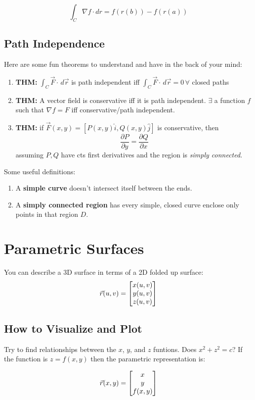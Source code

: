\documentclass[a4paper,12pt]{report}
\begin{document}
$$\int_C \nabla f \cdot dr = f(r(b)) - f(r(a))$$

\subsection{Path Independence}
Here are some fun theorems to understand and have in the back of your mind: 
\begin{enumerate}
\item \textbf{THM: } $\int_C \vec{F}\cdot\,d\vec{r}$ is path independent iff 
$\int_C \vec{F}\cdot\,d\vec{r} = 0 \, \forall$ closed paths
\item \textbf{THM: } A vector field is conservative iff it is path independent. 
$\exists$ a function $f$ such that $\nabla f = F$ iff conservative/path independent.
\item \textbf{THM: } if $\vec{F}(x, y) = [P(x, y)\hat{i}, Q(x, y)\hat{j}]$ is conservative, 
then $$\frac{\partial P}{\partial y} = \frac{\partial Q}{\partial x}$$ assuming $P, Q$ have cts first derivatives and 
the region is \textit{simply connected}.
\end{enumerate}

Some useful definitions:
\begin{enumerate}
\item A \textbf{simple curve} doesn't intersect itself between the ends.
\item A \textbf{simply connected region} has every simple, closed curve enclose only points in that region $D$.
\end{enumerate}

\section{Parametric Surfaces}
You can describe a 3D surface in terms of a 2D folded up surface:
$$\vec{r}(u, v) = 
\begin{bmatrix}
x(u, v) \\
y(u, v) \\
z(u, v) \notag
\end{bmatrix}
$$

\subsection{How to Visualize and Plot}
Try to find relationships between the $x$, $y$, and $z$ funtions. Does $x^2 + z^2 = c$? If the function is $z = f(x, y)$ then the 
parametric representation is: 

$$\vec{r}(x, y) = 
\begin{bmatrix}
x \\
y \\
f(x, y) \notag
\end{bmatrix}
$$
\end{document}
